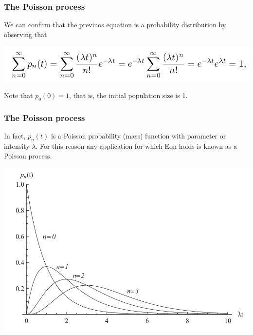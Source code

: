\documentclass[spanish]{beamer}
\begin{document}
\begin{frame}
\frametitle{The Poisson process}
We can confirm that the previuos equation is a probability distribution by observing that

\begin{center}
\includegraphics[scale=0.4]{im2}
\end{center}

Note that $p_{0}(0) = 1$, that is, the initial population size is 1.

\end{frame}

\begin{frame}
\frametitle{The Poisson process}
In fact, $p_{n}(t)$ is a Poisson probability (mass) function with parameter or intensity $\lambda$. For this reason any application for which Eqn holds is known as a Poisson process.
\begin{center}
\includegraphics[scale=0.3]{im4}
\end{center}
\end{frame}
\end{document}
